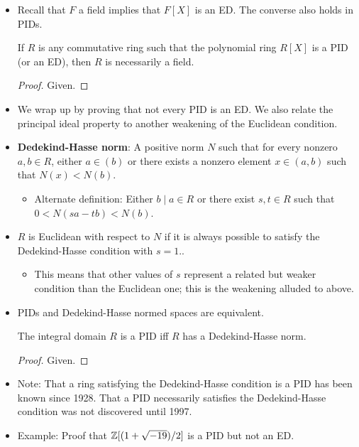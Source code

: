 \documentclass[../notes.tex]{subfiles}
\begin{document}
\begin{itemize}
    \begin{proposition}\label{prp:8.7}
        Every nonzero prime ideal in a PID is a maximal ideal.
        \begin{proof}
            See Lecture 4.3.
        \end{proof}
    \end{proposition}
    \item Recall that $F$ a field implies that $F[X]$ is an ED. The converse also holds in PIDs.
    \begin{corollary}\label{cly:8.8}
        If $R$ is any commutative ring such that the polynomial ring $R[X]$ is a PID (or an ED), then $R$ is necessarily a field.
        \begin{proof}
            Given.
        \end{proof}
    \end{corollary}
    \item We wrap up by proving that not every PID is an ED. We also relate the principal ideal property to another weakening of the Euclidean condition.
    \item \textbf{Dedekind-Hasse norm}: A positive norm $N$ such that for every nonzero $a,b\in R$, either $a\in(b)$ or there exists a nonzero element $x\in(a,b)$ such that $N(x)<N(b)$.
    \begin{itemize}
        \item Alternate definition: Either $b\mid a\in R$ or there exist $s,t\in R$ such that $0<N(sa-tb)<N(b)$.
    \end{itemize}
    \item $R$ is Euclidean with respect to $N$ if it is always possible to satisfy the Dedekind-Hasse condition with $s=1$..
    \begin{itemize}
        \item This means that other values of $s$ represent a related but weaker condition than the Euclidean one; this is the weakening alluded to above.
    \end{itemize}
    \item PIDs and Dedekind-Hasse normed spaces are equivalent.
    \begin{proposition}\label{prp:8.9}
        The integral domain $R$ is a PID iff $R$ has a Dedekind-Hasse norm.
        \begin{proof}
            Given.
        \end{proof}
    \end{proposition}
    \item Note: That a ring satisfying the Dedekind-Hasse condition is a PID has been known since 1928. That a PID necessarily satisfies the Dedekind-Hasse condition was not discovered until 1997.
    \item Example: Proof that $\mathbb{Z}[(1+\sqrt{-19})/2]$ is a PID but not an ED.
\end{itemize}
\end{document}
